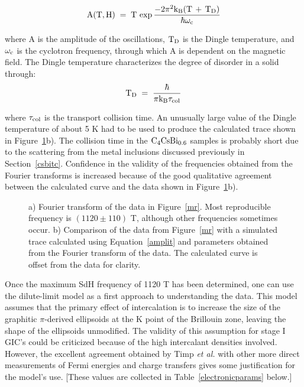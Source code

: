 \begin{equation}
\label{amplit}
\rm A(T, H) \; = \; T \, \exp \frac{- 2 \pi^2 k_B (T \, + \, T_D)}{\hbar \omega_c}
\end{equation}

\noindent where A is the amplitude of the oscillations,  $\rm T_D$ is the
Dingle temperature, and $\rm \omega_c$ is  the cyclotron frequency, through
which  A is   dependent  on the  magnetic  field.    The Dingle temperature
characterizes the degree of disorder in a solid through:\cite{Z260}\\

\begin{displaymath}
\rm T_D \; = \; \frac{\hbar}{\pi k_B \tau_{col}}
\end{displaymath}

\noindent where $\rm \tau_{col}$ is the transport collision time.  An
unusually large value of the Dingle temperature of about 5 K had to be used
to produce the  calculated  trace shown in   Figure~\ref{sdh:calc}b).   The
collision time in the $\rm C_4CsBi_{0.6}$ samples is probably short  due to
the scattering   from  the  metal   inclusions  discussed    previously  in
Section~\ref{csbitc}.  Confidence   in the  validity   of  the  frequencies
obtained  from the Fourier transforms  is  increased  because  of the  good
qualitative agreement between the  calculated curve and  the data shown  in
Figure~\ref{sdh:calc}b).

\begin{figure}
\center
{} 
\caption[Fourier transform of SdH data; simulated SdH trace]{a) Fourier transform of the data in Figure~\ref{mr}.  Most
reproducible  frequency is $(1120  \pm 110)$ T,  although other frequencies
sometimes occur.  b)  Comparison of the  data  from Figure~\ref{mr}  with a
simulated trace   calculated  using  Equation~\ref{amplit}   and parameters
obtained from the Fourier transform of the  data.   The calculated curve is
offset from the data for clarity.}
\label{sdh:calc}
\end{figure}

	Once the maximum  SdH frequency of  1120 T has been determined, one
can use  the dilute-limit  model as a  first approach to understanding  the
data.  This model assumes  that the primary  effect of intercalation is  to
increase the size of the graphitic $\pi$-derived ellipsoids at the  K point
of the Brillouin zone, leaving the shape of the ellipsoids unmodified.  The
validity of this assumption for  stage I  GIC's could be criticized because
of  the high  intercalant   densities  involved.  However,  the   excellent
agreement obtained by Timp {\em  et al.}\cite{W179} with  other more direct
measurements  of   Fermi   energies  and    charge transfers  gives    some
justification  for  the  model's  use.   [These   values  are  collected in
Table~\ref{electronicparams} below.]

